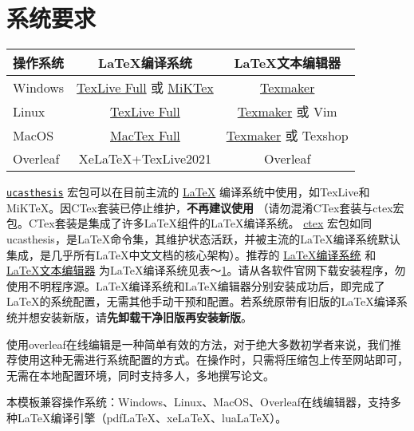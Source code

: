 \section{系统要求}\label{sec:system}
\begin{table}
    \footnotesize
    \setlength{\tabcolsep}{4pt}
    \renewcommand{\arraystretch}{1.5}
    \centering
    \begin{tabular}{lcc}
        \hline
        操作系统 & LaTeX编译系统 & LaTeX文本编辑器\\
        \hline
        Windows & \href{https://www.tug.org/texlive/acquire-netinstall.html}{TexLive Full} 或 \href{https://miktex.org/download}{MiKTex} & \href{http://www.xm1math.net/texmaker/}{Texmaker}\\
        Linux & \href{https://www.tug.org/texlive/acquire-netinstall.html}{TexLive Full} & \href{http://www.xm1math.net/texmaker/}{Texmaker} 或 Vim\\
        MacOS & \href{https://www.tug.org/mactex/}{MacTex Full} & \href{http://www.xm1math.net/texmaker/}{Texmaker} 或 Texshop\\
        Overleaf & XeLaTeX+TexLive2021 & Overleaf \\
        \hline
    \end{tabular}
    \label{tab:compiler}
\end{table}
\href{https://github.com/mohuangrui/ucasthesis}{\texttt{ucasthesis}} 宏包可以在目前主流的 \href{https://en.wikibooks.org/wiki/LaTeX/Introduction}{LaTeX} 编译系统中使用，如TexLive和MiKTeX。因CTex套装已停止维护，\textbf{不再建议使用} （请勿混淆CTex套装与ctex宏包。CTex套装是集成了许多LaTeX组件的LaTeX编译系统。 \href{https://ctan.org/pkg/ctex?lang=en}{ctex} 宏包如同ucasthesis，是LaTeX命令集，其维护状态活跃，并被主流的LaTeX编译系统默认集成，是几乎所有LaTeX中文文档的核心架构）。推荐的 \href{https://en.wikibooks.org/wiki/LaTeX/Installation}{LaTeX编译系统} 和 \href{https://en.wikibooks.org/wiki/LaTeX/Installation}{LaTeX文本编辑器} 为LaTeX编译系统见表～\ref{tab:compiler}。请从各软件官网下载安装程序，勿使用不明程序源。LaTeX编译系统和LaTeX编辑器分别安装成功后，即完成了LaTeX的系统配置，无需其他手动干预和配置。若系统原带有旧版的LaTeX编译系统并想安装新版，请\textbf{先卸载干净旧版再安装新版}。

使用overleaf在线编辑是一种简单有效的方法，对于绝大多数初学者来说，我们推荐使用这种无需进行系统配置的方式。在操作时，只需将压缩包上传至网站即可，无需在本地配置环境，同时支持多人，多地撰写论文。

本模板兼容操作系统：Windows、Linux、MacOS、Overleaf在线编辑器，支持多种LaTeX编译引擎（pdfLaTeX、xeLaTeX、luaLaTeX）。
